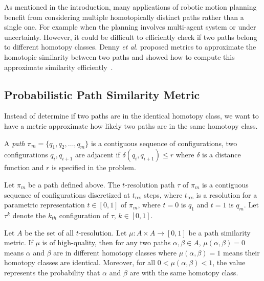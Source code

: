 
As mentioned in the introduction, many applications of robotic motion planning benefit from considering multiple homotopically distinct paths rather than a single one. For example when the planning involves multi-agent system or under uncertainty. However, it could be difficult to efficiently check if two paths belong to different homotopy classes. Denny \emph{et al.} proposed metrics to approximate the homotopic similarity between two paths and showed how to compute this approximate similarity efficiently~\cite{denny2018topology}.

\subsection{Probabilistic Path Similarity Metric}
Instead of determine if two paths are in the identical homotopy class, we want to have a metric approximate how likely two paths are in the same homotopy class.
\begin{definition}
  A \emph{path} \(\pi_m=\{q_1,q_2,\dots,q_m\}\) is a contiguous sequence of configurations, two configurations \(q_i,q_{i+1}\) are adjacent if \(\delta(q_i,q_{i+1})\le r\) where \(\delta\) is a distance function and \(r\) is specified in the problem.
\end{definition}\label{def:path}
\begin{definition}
  Let \(\pi_m\) be a path defined above.
  The \(t\)-resolution path \(\tau\) of \(\pi_m\) is a contiguous sequence of configurations discretized at \(t_{\mathrm{res}}\) steps, where \(t_{\mathrm{res}}\) is a resolution for a parametric representation \(t\in[0,1]\) of \(\pi_m\), where \(t=0\) is \(q_1\) and \(t=1\) is \(q_m\). Let \(\tau^k\) denote the \(k_{th}\) configuration of \(\tau\), \(k\in [0,1]\).
\end{definition}
Let \(A\) be the set of all \(t\)-resolution. Let \(\mu:A\times A\to [0,1]\) be a path similarity metric.
If \(\mu\) is of high-quality, then for any two paths \(\alpha, \beta\in A\), \(\mu(\alpha,\beta)=0\) means \(\alpha\) and \(\beta\) are in different homotopy classes where \(\mu(\alpha,\beta)=1\) means their homotopy classes are identical. Moreover, for all \(0<\mu(\alpha,\beta)<1\), the value represents the probability that \(\alpha\) and \(\beta\) are with the same homotopy class.
